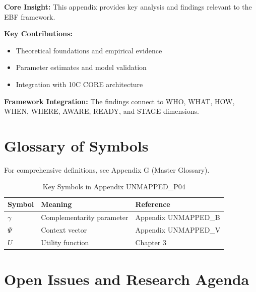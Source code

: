 \begin{tcolorbox}[colback=gray!5!white, colframe=gray!75!black,
    title=Appendix UNMAPPED_P04 Summary]

\textbf{Core Insight:}
This appendix provides key analysis and findings relevant to the EBF framework.

\textbf{Key Contributions:}
\begin{itemize}[nosep]
    \item Theoretical foundations and empirical evidence
    \item Parameter estimates and model validation
    \item Integration with 10C CORE architecture
\end{itemize}

\textbf{Framework Integration:}
The findings connect to WHO, WHAT, HOW, WHEN, WHERE, AWARE, READY, and STAGE dimensions.

\end{tcolorbox}

\section{Glossary of Symbols}
\label{sec:p04-glossary}

For comprehensive definitions, see Appendix G (Master Glossary).

\begin{table}[htbp]
\centering
\caption{Key Symbols in Appendix UNMAPPED_P04}
\begin{tabular}{lll}
\toprule
\textbf{Symbol} & \textbf{Meaning} & \textbf{Reference} \\
\midrule
$\gamma$ & Complementarity parameter & Appendix UNMAPPED_B \\
$\Psi$ & Context vector & Appendix UNMAPPED_V \\
$U$ & Utility function & Chapter 3 \\
\bottomrule
\end{tabular}
\end{table}



\section{Open Issues and Research Agenda}
\label{sec:p04-open}

